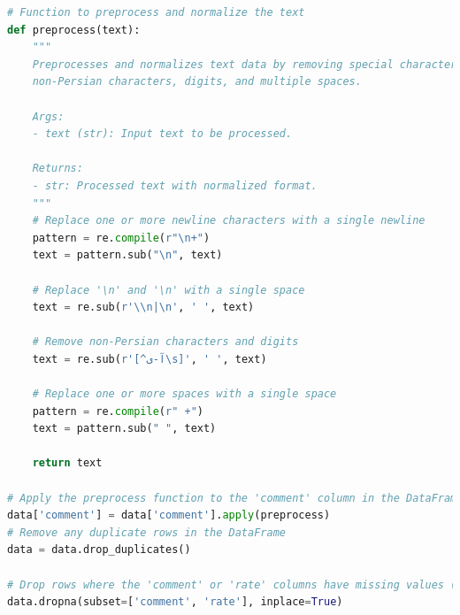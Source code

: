 \documentclass{solutionclass} %
\begin{document}
\begin{lstlisting}[language=Python]
	# Function to preprocess and normalize the text
def preprocess(text):
    """
    Preprocesses and normalizes text data by removing special characters,
    non-Persian characters, digits, and multiple spaces.

    Args:
    - text (str): Input text to be processed.

    Returns:
    - str: Processed text with normalized format.
    """
    # Replace one or more newline characters with a single newline
    pattern = re.compile(r"\n+")
    text = pattern.sub("\n", text)
    
    # Replace '\n' and '\n' with a single space
    text = re.sub(r'\\n|\n', ' ', text)
    
    # Remove non-Persian characters and digits
    text = re.sub(r'[^آ-ی\s]', ' ', text)
    
    # Replace one or more spaces with a single space
    pattern = re.compile(r" +")
    text = pattern.sub(" ", text)
    
    return text

# Apply the preprocess function to the 'comment' column in the DataFrame data
data['comment'] = data['comment'].apply(preprocess)
# Remove any duplicate rows in the DataFrame
data = data.drop_duplicates()

# Drop rows where the 'comment' or 'rate' columns have missing values (NaN)
data.dropna(subset=['comment', 'rate'], inplace=True)
\end{lstlisting}
\end{document}

